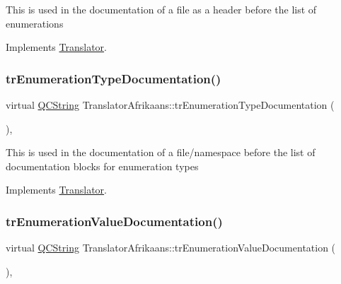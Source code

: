This is used in the documentation of a file as a header before the list of enumerations 

Implements \mbox{\hyperlink{class_translator}{Translator}}.

\mbox{\label{class_translator_afrikaans_a84688dc04c1a80457bc86bb947d66f16}} 
\subsubsection{\texorpdfstring{trEnumerationTypeDocumentation()}{trEnumerationTypeDocumentation()}}
{\footnotesize\ttfamily virtual \mbox{\hyperlink{class_q_c_string}{Q\+C\+String}} Translator\+Afrikaans\+::tr\+Enumeration\+Type\+Documentation (\begin{DoxyParamCaption}{ }\end{DoxyParamCaption})\hspace{0.3cm}{\ttfamily [inline]}, {\ttfamily [virtual]}}

This is used in the documentation of a file/namespace before the list of documentation blocks for enumeration types 

Implements \mbox{\hyperlink{class_translator}{Translator}}.

\mbox{\label{class_translator_afrikaans_ae10e74ed678adac63b1340353c61cae7}} 
\subsubsection{\texorpdfstring{trEnumerationValueDocumentation()}{trEnumerationValueDocumentation()}}
{\footnotesize\ttfamily virtual \mbox{\hyperlink{class_q_c_string}{Q\+C\+String}} Translator\+Afrikaans\+::tr\+Enumeration\+Value\+Documentation (\begin{DoxyParamCaption}{ }\end{DoxyParamCaption})\hspace{0.3cm}{\ttfamily [inline]}, {\ttfamily [virtual]}}

